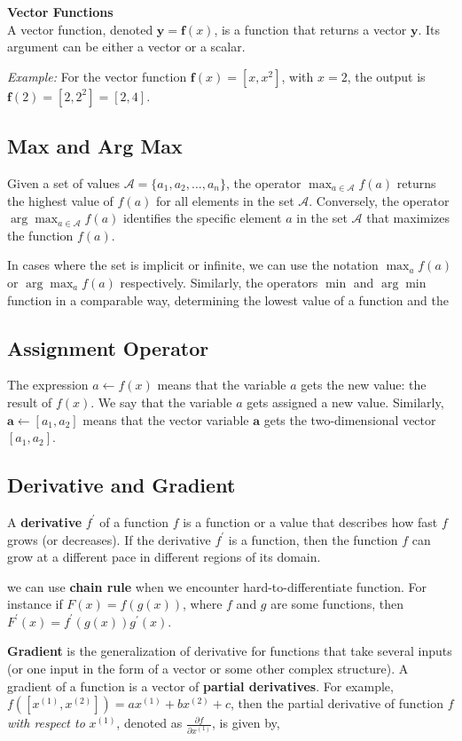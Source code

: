 \textbf{Vector Functions}\\
A vector function, denoted \( \mathbf{y} = \mathbf{f}(x) \), is a function that returns a vector \( \mathbf{y} \). Its argument can be either a vector or a scalar.

\emph{Example:} For the vector function \( \mathbf{f}(x) = [x, x^2] \), with \( x = 2 \), the output is \( \mathbf{f}(2) = [2, 2^2] = [2, 4] \).

\subsection{Max and Arg Max}

Given a set of values \( \mathcal{A} = \{a_{1}, a_{2}, \ldots, a_{n}\} \), the operator \( \max_{a \in \mathcal{A}} f(a) \) returns the highest value of \( f(a) \) for all elements in the set \( \mathcal{A} \). Conversely, the operator \( \arg \max_{a \in \mathcal{A}} f(a) \) identifies the specific element \( a \) in the set \( \mathcal{A} \) that maximizes the function \( f(a) \).

In cases where the set is implicit or infinite, we can use the notation \( \max_{a} f(a) \) or \( \arg \max_{a} f(a) \) respectively. Similarly, the operators \( \min \) and \( \arg \min \) function in a comparable way, determining the lowest value of a function and the

\subsection{Assignment Operator}
The expression \(a \leftarrow f(x)\) means that the variable \(a\) gets the new value: the result of \(f(x)\). We say that the variable \(a\) gets assigned a new value. Similarly, \(\mathbf{a} \leftarrow\left[a_{1}, a_{2}\right]\) means that the vector variable \(\mathbf{a}\) gets the two-dimensional vector \(\left[a_{1}, a_{2}\right]\).

\subsection{Derivative and Gradient}
A \textbf{derivative} \(f^{\prime}\) of a function \(f\) is a function or a value that describes how fast \(f\) grows (or decreases). If the derivative \(f^{\prime}\) is a function, then the function \(f\) can grow at a different pace in different regions of its domain.

we can use \textbf{chain rule} when we encounter hard-to-differentiate function. For instance if \(F(x)=f(g(x))\), where \(f\) and \(g\) are some functions, then \(F^{\prime}(x)= f^{\prime}(g(x)) g^{\prime}(x)\).

\textbf{Gradient} is the generalization of derivative for functions that take several inputs (or one input in the form of a vector or some other complex structure). A gradient of a function is a vector of \textbf{partial derivatives}. For example, \(f\left(\left[x^{(1)}, x^{(2)}\right]\right)=a x^{(1)}+b x^{(2)}+c\), then the partial derivative of function \(f\) \textit{with respect to} \(x^{(1)}\), denoted as \(\frac{\partial f}{\partial x^{(1)}}\), is given by,